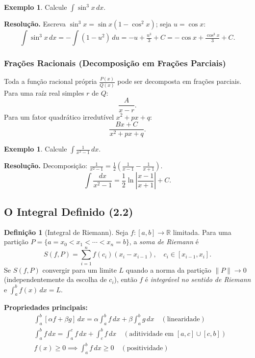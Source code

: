 \documentclass[12pt,a4paper]{article}
\theoremstyle{definition}
\newtheorem{definition}[theorem]{Definição}
\newtheorem{example}[theorem]{Exemplo}
\theoremstyle{remark}
\begin{document}
\begin{example}
  Calcule $\displaystyle\int \sin^3 x\,dx$.

  \textbf{Resolução.} Escreva $\sin^3 x = \sin x(1-\cos^2 x)$; seja $u=\cos x$:
  \[
    \int \sin^3 x\,dx = -\int (1-u^2)\,du = -u + \tfrac{u^3}{3}+C
      = -\cos x + \tfrac{\cos^3 x}{3}+C.
  \]
\end{example}

\subsubsection*{Frações Racionais (Decomposição em Frações Parciais)}

Toda a função racional própria $\frac{P(x)}{Q(x)}$ pode ser decomposta em
frações parciais. Para uma raíz real simples $r$ de $Q$:
\[
  \frac{A}{x-r}.
\]
Para um fator quadrático irredutível $x^2+px+q$:
\[
  \frac{Bx+C}{x^2+px+q}.
\]

\begin{example}
  Calcule $\displaystyle\int \frac{1}{x^2-1}\,dx$.

  \textbf{Resolução.} Decomposição: $\frac{1}{x^2-1}=\frac{1}{2}\!\left(\frac{1}{x-1}-\frac{1}{x+1}\right)$.
  \[
    \int \frac{dx}{x^2-1} = \frac{1}{2}\ln\left|\frac{x-1}{x+1}\right|+C.
  \]
\end{example}

\subsection{O Integral Definido (2.2)}

\begin{definition}[Integral de Riemann]
  Seja $f:[a,b]\to\mathbb{R}$ limitada. Para uma partição
  $P=\{a=x_0<x_1<\cdots<x_n=b\}$, a \emph{soma de Riemann} é
  \[
    S(f,P) = \sum_{i=1}^n f(c_i)(x_i - x_{i-1}),\quad c_i\in[x_{i-1},x_i].
  \]
  Se $S(f,P)$ convergir para um limite $L$ quando a norma da partição
  $\|P\|\to 0$ (independentemente da escolha de $c_i$), então $f$ é
  \emph{integrável no sentido de Riemann} e $\displaystyle\int_a^b f(x)\,dx = L$.
\end{definition}

\begin{keybox}
\textbf{Propriedades principais:}
\begin{align*}
  &\int_a^b [\alpha f+\beta g]\,dx = \alpha\int_a^b f\,dx + \beta\int_a^b g\,dx
    \quad (\text{linearidade})\\
  &\int_a^b f\,dx = \int_a^c f\,dx + \int_c^b f\,dx
    \quad (\text{aditividade em } [a,c]\cup[c,b])\\
  &f(x)\geq 0 \implies \int_a^b f\,dx \geq 0
    \quad (\text{positividade})
\end{align*}
\end{keybox}
\end{document}
